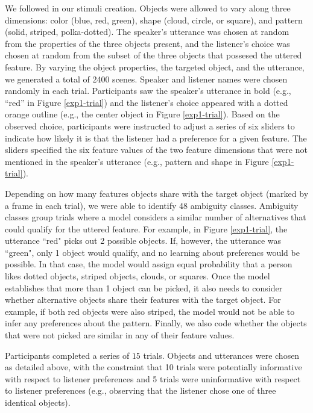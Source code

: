 \documentclass[10pt,a4paper]{article}
\begin{document}
We followed  in our stimuli creation. Objects were allowed to vary along three dimensions: color (blue, red, green), shape (cloud, circle, or square), and pattern (solid, striped, polka-dotted). The speaker's utterance was chosen at random from the properties of the three objects present, and the listener's choice was chosen at random from the subset of the three objects that possesed the uttered feature. By varying the object properties, the targeted object, and the utterance, we generated a total of 2400 scenes. Speaker and listener names were chosen randomly in each trial. Participants saw the speaker's utterance in bold (e.g., ``red'' in Figure \ref{exp1-trial}) and the listener's choice appeared with a dotted orange outline (e.g., the center object in Figure \ref{exp1-trial}). Based on the observed choice, participants were instructed to adjust a series of six sliders to indicate how likely it is that the listener had a preference for a given feature. The sliders specified the six feature values of the two feature dimensions that were not mentioned in the speaker's utterance (e.g., pattern and shape in Figure \ref{exp1-trial}). 

Depending on how many features objects share with the target object (marked by a frame in each trial), we were able to identify 48 ambiguity classes. Ambiguity classes group trials where a model considers a similar number of alternatives that could qualify for the uttered feature. For example, in Figure \ref{exp1-trial}, the utterance ``red" picks out 2 possible objects. If, however, the utterance was ``green", only 1 object would qualify, and no learning about preferencs would be possible. In that case, the model would assign equal probability that a person likes dotted objects, striped objects, clouds, or squares. Once the model establishes that more than 1 object can be picked, it also needs to consider whether alternative objects share their features with the target object. For example, if both red objects were also striped, the model would not be able to infer any preferences about the pattern. Finally, we also code whether the objects that were not picked are similar in any of their feature values.

Participants completed a series of $15$ trials. Objects and utterances were chosen as detailed above, with the constraint that 10 trials were potentially informative with respect to listener preferences and 5 trials were uninformative with respect to listener preferences (e.g., observing that the listener chose one of three identical objects). 
\end{document}
